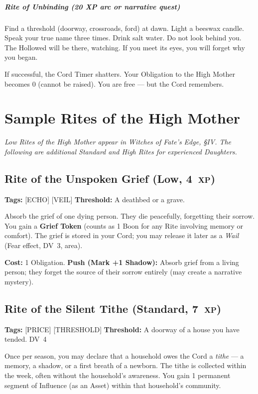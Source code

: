 \documentclass[10pt,twoside]{book}
\newcommand{\dv}[1]{\textsc{DV}~#1}
\newcommand{\xp}[1]{#1~\textsc{xp}}
\begin{document}
\paragraph{Rite of Unbinding (20 XP arc or narrative quest)}
Find a threshold (doorway, crossroads, ford) at dawn. Light a beeswax candle. Speak your true name three times. Drink salt water. Do not look behind you. The Hollowed will be there, watching. If you meet its eyes, you will forget why you began.

If successful, the Cord Timer shatters. Your Obligation to the High Mother becomes 0 (cannot be raised). You are free --- but the Cord remembers.

\chapter{Sample Rites of the High Mother}

\textit{Low Rites of the High Mother appear in Witches of Fate's Edge, §IV. The following are additional Standard and High Rites for experienced Daughters.}

\section{Rite of the Unspoken Grief (Low, \xp{4})}
\textbf{Tags:} [ECHO] [VEIL] \quad \textbf{Threshold:} A deathbed or a grave.

Absorb the grief of one dying person. They die peacefully, forgetting their sorrow. You gain a \textbf{Grief Token} (counts as 1 Boon for any Rite involving memory or comfort). The grief is stored in your Cord; you may release it later as a \textit{Wail} (Fear effect, \dv{3}, area).

\textbf{Cost:} 1 Obligation. \textbf{Push (Mark +1 Shadow):} Absorb grief from a living person; they forget the source of their sorrow entirely (may create a narrative mystery).

\section{Rite of the Silent Tithe (Standard, \xp{7})}
\textbf{Tags:} [PRICE] [THRESHOLD] \quad \textbf{Threshold:} A doorway of a house you have tended. \quad \dv{4}

Once per season, you may declare that a household owes the Cord a \textit{tithe} --- a memory, a shadow, or a first breath of a newborn. The tithe is collected within the week, often without the household's awareness. You gain 1 permanent segment of Influence (as an Asset) within that household's community.
\end{document}

